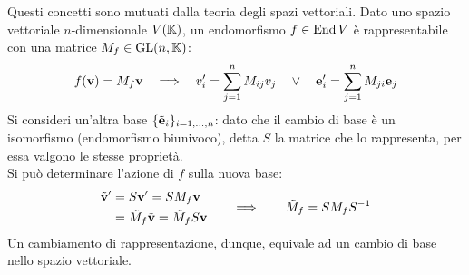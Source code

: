 Questi concetti sono mutuati dalla teoria degli spazi vettoriali. Dato uno spazio vettoriale $ n $-dimensionale $ V(\mathbb{K}) $, un endomorfismo $ f \in \operatorname{End}{V} $ è rappresentabile con una matrice $ M_f \in \mathrm{GL}(n,\mathbb{K}) $:
\begin{equation*}
	f(\mathbf{v}) = M_f \mathbf{v} \quad \Longrightarrow \quad v'_i = \sum_{j = 1}^{n} M_{ij} v_j \quad \lor \quad \mathbf{e}'_i = \sum_{j = 1}^{n} M_{ji} \mathbf{e}_j
\end{equation*}
Si consideri un'altra base $ \{\tilde{\mathbf{e}}_i\}_{i = 1, \dots, n} $: dato che il cambio di base è un isomorfismo (endomorfismo biunivoco), detta $ S $ la matrice che lo rappresenta, per essa valgono le stesse proprietà.\\
Si può determinare l'azione di $ f $ sulla nuova base:
\begin{equation*}
	\begin{split}
		\tilde{\mathbf{v}}'
		&= S \mathbf{v}' = S M_f \mathbf{v}\\
		&= \tilde{M}_f \tilde{\mathbf{v}} = \tilde{M}_f S \mathbf{v}
	\end{split}
	\qquad \Longrightarrow \qquad
	\tilde{M}_f = S M_f S^{-1}
\end{equation*}
Un cambiamento di rappresentazione, dunque, equivale ad un cambio di base nello spazio vettoriale.










